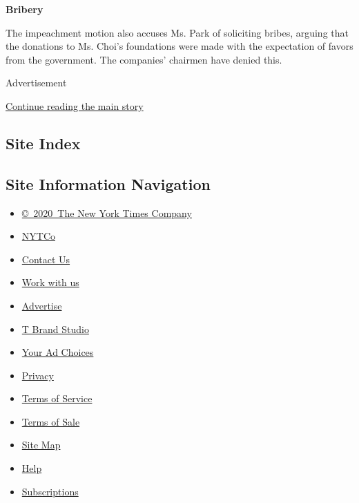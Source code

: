 \textbf{Bribery}

The impeachment motion also accuses Ms. Park of soliciting bribes,
arguing that the donations to Ms. Choi's foundations were made with the
expectation of favors from the government. The companies' chairmen have
denied this.

Advertisement

\protect\hyperlink{after-bottom}{Continue reading the main story}

\hypertarget{site-index}{%
\subsection{Site Index}\label{site-index}}

\hypertarget{site-information-navigation}{%
\subsection{Site Information
Navigation}\label{site-information-navigation}}

\begin{itemize}
\tightlist
\item
  \href{https://help.nytimes3xbfgragh.onion/hc/en-us/articles/115014792127-Copyright-notice}{©~2020~The
  New York Times Company}
\end{itemize}

\begin{itemize}
\tightlist
\item
  \href{https://www.nytco.com/}{NYTCo}
\item
  \href{https://help.nytimes3xbfgragh.onion/hc/en-us/articles/115015385887-Contact-Us}{Contact
  Us}
\item
  \href{https://www.nytco.com/careers/}{Work with us}
\item
  \href{https://nytmediakit.com/}{Advertise}
\item
  \href{http://www.tbrandstudio.com/}{T Brand Studio}
\item
  \href{https://www.nytimes3xbfgragh.onion/privacy/cookie-policy\#how-do-i-manage-trackers}{Your
  Ad Choices}
\item
  \href{https://www.nytimes3xbfgragh.onion/privacy}{Privacy}
\item
  \href{https://help.nytimes3xbfgragh.onion/hc/en-us/articles/115014893428-Terms-of-service}{Terms
  of Service}
\item
  \href{https://help.nytimes3xbfgragh.onion/hc/en-us/articles/115014893968-Terms-of-sale}{Terms
  of Sale}
\item
  \href{https://spiderbites.nytimes3xbfgragh.onion}{Site Map}
\item
  \href{https://help.nytimes3xbfgragh.onion/hc/en-us}{Help}
\item
  \href{https://www.nytimes3xbfgragh.onion/subscription?campaignId=37WXW}{Subscriptions}
\end{itemize}
